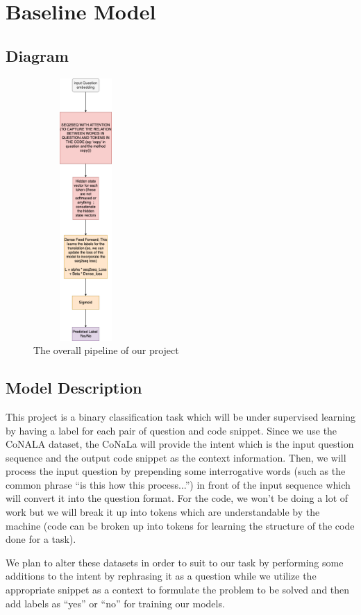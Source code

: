\documentclass[11pt,a4paper]{article}
\begin{document}
\section{Baseline Model}
\subsection{Diagram}
\begin{figure}
    \centering
    \includegraphics[height=10cm,width=4cm]{ModelPipeline.pdf}
    \caption{The overall pipeline of our project}
    \label{fig:my_label}
\end{figure}

\subsection{Model Description}
This project is a binary classification task which will be under supervised learning by having a label for each pair of question and code snippet. Since we use the CoNALA dataset, the CoNaLa will provide the intent
which is the input question sequence and the output code snippet as
the context information. Then, we will process the input question by
prepending some interrogative words (such as the common phrase “is
this how this process...”) in front of the input sequence which will
convert it into the question format. For the code, we won’t be doing a
lot of work but we will break it up into tokens which are
understandable by the machine (code can be broken up into tokens for
learning the structure of the code done for a task).

We plan to alter these datasets in order to suit to our task by
performing some additions to the intent by rephrasing it as a question
while we utilize the appropriate snippet as a context to formulate the
problem to be solved and then add labels as “yes” or “no” for training
our models.
\end{document}
